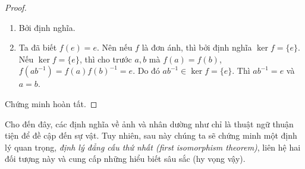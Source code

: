 \begin{proof}\leavevmode
  \begin{enumerate}
    \item Bởi định nghĩa.
    \item Ta đã biết $f(e) = e$. Nên nếu $f$ là đơn ánh, thì bởi định nghĩa $\ker f = \{e\}$. Nếu $\ker f = \{e\}$, thì cho trước $a, b$ mà $f(a) = f(b)$, $f(ab^{-1}) = f(a)f(b)^{-1} = e$. Do đó $ab^{-1}\in \ker f = \{e\}$. Thì $ab^{-1} = e$ và $a = b$.\qedhere
  \end{enumerate}
  Chứng minh hoàn tất.
\end{proof}

Cho đến đây, các định nghĩa về ảnh và nhân dường như chỉ là thuật ngữ thuận tiện để đề cập đến sự vật. Tuy nhiên, sau này chúng ta sẽ chứng minh một định lý quan trọng, \emph{định lý đẳng cấu thứ nhất (first isomorphism theorem)}, liên hệ hai đối tượng này và cung cấp những hiểu biết sâu sắc (hy vọng vậy).
